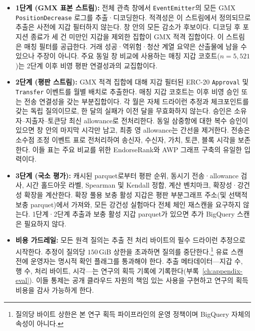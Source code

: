 \begin{itemize}
\item \textbf{1단계 (GMX 표본 스트림):} 전체 관측 창에서 \texttt{EventEmitter}의 모든 GMX \texttt{PositionDecrease} 로그를 추출·디코딩한다. 적격성은 이 스트림에서 정의되므로 추출은 사전에 지갑 필터하지 않는다. 창 안의 모든 감소가 후보이다. 디코딩 후 포지션 종료가 세 건 미만인 지갑을 제외한 집합이 GMX 적격 집합이다. 이 스트림은 매칭 필터를 공급한다. 거래 성공·역위험·청산 계열 요약은 산출물에 남을 수 있으나 주장이 아니다. 주요 동일 창 비교에 사용하는 매칭 지갑 코호트($n=5{,}521$)는 2단계 이후 비영 평판 연결성과의 교집합이다.

\item \textbf{2단계 (평판 스트림):} GMX 적격 집합에 대해 지갑 필터된 ERC-20 \texttt{Approval} 및 \texttt{Transfer} 이벤트를 월별 배치로 추출한다. 매칭 지갑 코호트는 이후 비영 승인 또는 전송 연결성을 갖는 부분집합이다. 각 월은 자체 드라이런 추정과 체크포인트를 갖는 독립 질의이므로, 한 달의 실패가 이전 달을 무효화하지 않는다. 승인은 소유자--지출자--토큰당 최신 allowance로 전처리한다. 동일 삼중항에 대한 복수 승인이 있으면 창 안의 마지막 시각만 남고, 최종 영 allowance는 간선을 제거한다. 전송은 소수점 조정 이벤트 표로 전처리하여 송신자, 수신자, 가치, 토큰, 블록 시각을 보존한다. 이들 표는 주요 비교를 위한 EndorseRank와 AWP 그래프 구축의 유일한 입력이다.

\item \textbf{3단계 (국소 평가):} 캐시된 parquet로부터 평판 순위, 동시기 전송·allowance 검사, 시간 홀드아웃 라벨, Spearman 및 Kendall 정합, 계산 벤치마크, 확장성·강건성 확장을 계산한다. 확장 풀용 보충 활성 지갑은 평판 부분그래프 주소(및 선택적 보충 parquet)에서 가져와, 모든 강건성 실험마다 전체 체인 재스캔을 요구하지 않는다. 1단계·2단계 추출과 보충 활성 지갑 parquet가 있으면 추가 BigQuery 스캔은 필요하지 않다.

\item \textbf{비용 가드레일:} 모든 원격 질의는 추출 전 처리 바이트의 필수 드라이런 추정으로 시작한다. 추정이 질의당 $150$\,GiB 상한을 초과하면 질의를 중단한다.\footnote{질의당 바이트 상한은 본 연구 획득 파이프라인의 운영 정책이며 BigQuery 자체의 속성이 아니다.} 유료 스캔 전에 운영자는 명시적 확인 플래그를 통과해야 한다. 추출 메타데이터---지갑 수, 행 수, 처리 바이트, 시각---는 연구의 획득 기록에 기록한다(부록~\ref{ch:appendix-eval}). 이들 통제는 공개 클라우드 자원의 책임 있는 사용을 구현하고 연구의 획득 비용을 감사 가능하게 한다.

\end{itemize}

